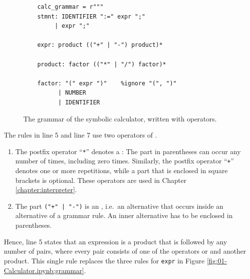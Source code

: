 \begin{figure}[!ht]
\centering
\begin{verbatim}
    calc_grammar = r"""
    stmnt: IDENTIFIER ":=" expr ";"
         | expr ";"

    expr: product (("+" | "-") product)*

    product: factor (("*" | "/") factor)*

    factor: "(" expr ")"    %ignore "(", ")"
          | NUMBER
          | IDENTIFIER
\end{verbatim}
\vspace*{-0.3cm}
\caption{The grammar of the symbolic calculator, written with  operators.}
\label{fig:01-Calculator-EBNF.ipynb:grammar}
\end{figure}

\noindent
The rules in line 5 and line 7 use two operators of .
\begin{enumerate}
\item The postfix operator ``\texttt{*}'' denotes a :
      The part in parentheses can occur any number of times, including zero times.  Similarly, the postfix
      operator ``\texttt{+}'' denotes one or more repetitions, while a part that is enclosed in square brackets
      is optional.  These operators are used in Chapter \ref{chapter:interpreter}.
\item The part \verb!("+" | "-")! is an , i.e.~an
      alternative that occurs inside an alternative of a grammar rule.  An inner alternative has to be enclosed
      in parentheses.
\end{enumerate}
Hence, line 5 states that an expression is a product that is followed by any number of pairs, where every
pair consists of one of the operators \squoted{+} or \squoted{-} and another product.  This single rule
replaces the three rules for \texttt{expr} in Figure \ref{fig:01-Calculator.ipynb:grammar}.

